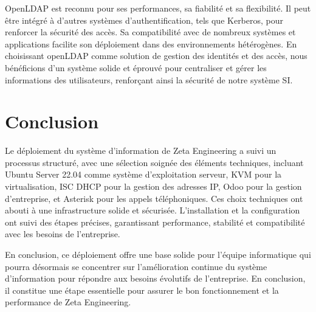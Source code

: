 OpenLDAP est reconnu pour ses performances, sa fiabilité et sa flexibilité. Il peut être intégré à d'autres systèmes d'authentification, tels que Kerberos, pour renforcer la sécurité des accès. Sa compatibilité avec de nombreux systèmes et applications facilite son déploiement dans des environnements hétérogènes. En choisissant openLDAP comme solution de gestion des identités et des accès, nous bénéficions d'un système solide et éprouvé pour centraliser et gérer les informations des utilisateurs, renforçant ainsi la sécurité de notre système SI.\\

\section{Conclusion}

Le déploiement du système d'information de Zeta Engineering a suivi un processus structuré, avec une sélection soignée des éléments techniques, incluant Ubuntu Server 22.04 comme système d'exploitation serveur, KVM pour la virtualisation, ISC DHCP pour la gestion des adresses IP, Odoo pour la gestion d'entreprise, et Asterisk pour les appels téléphoniques. Ces choix techniques ont abouti à une infrastructure solide et sécurisée. L'installation et la configuration ont suivi des étapes précises, garantissant performance, stabilité et compatibilité avec les besoins de l'entreprise. 

En conclusion, ce déploiement offre une base solide pour l'équipe informatique qui pourra désormais se concentrer sur l'amélioration continue du système d'information pour répondre aux besoins évolutifs de l'entreprise. En conclusion, il constitue une étape essentielle pour assurer le bon fonctionnement et la performance de Zeta Engineering.
